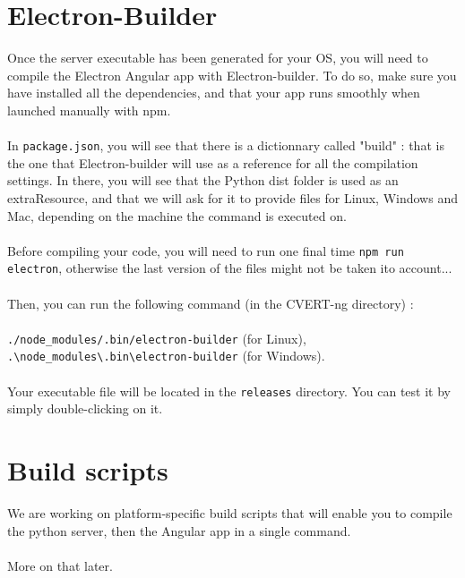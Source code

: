 \documentclass[12pt,a4paper]{article}
\begin{document}
\section{Electron-Builder}

Once the server executable has been generated for your OS, you will need to compile the Electron Angular app with Electron-builder. To do so, make sure you have installed all the dependencies, and that your app runs smoothly when launched manually with npm.\\
~\\
In \texttt{package.json}, you will see that there is a dictionnary called "build" : that is the one that Electron-builder will use as a reference for all the compilation settings. In there, you will see that the Python dist folder is used as an extraResource, and that we will ask for it to provide files for Linux, Windows and Mac, depending on the machine the command is executed on.\\
~\\
Before compiling your code, you will need to run one final time \texttt{npm run electron}, otherwise the last version of the files might not be taken ito account...\\
~\\
Then, you can run the following command (in the CVERT-ng directory) :\\
~\\
\texttt{./node\_modules/.bin/electron-builder} (for Linux),\\
\texttt{.\textbackslash node\_modules\textbackslash .bin\textbackslash electron-builder} (for Windows).\\
~\\
Your executable file will be located in the \texttt{releases} directory. You can test it by simply double-clicking on it.

\section{Build scripts}

We are working on platform-specific build scripts that will enable you to compile the python server, then the Angular app in a single command.\\
~\\
More on that later.
\end{document}
